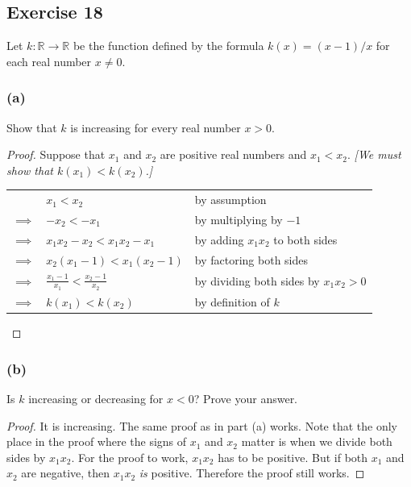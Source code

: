 \documentclass[14pt]{extarticle}
\newcommand{\dps}{\displaystyle}
\newcommand{\R}{\mathbb{R}}
\newcommand{\cy}{\color{cyan}}
\begin{document}
\subsection{Exercise 18}
Let \(k: \R \to \R\) be the function defined by the formula \(k(x) = (x - 1)/x\) for each real number \(x \neq 0\).

\subsubsection{(a)}
Show that \(k\) is increasing for every real number \(x > 0\).

\begin{proof}
Suppose that \(x_1\) and \(x_2\) are positive real numbers and \(x_1 < x_2\). {\it [We must show that \(k(x_1) < k(x_2)\).]} 

\begin{center}
\begin{tabular}{cll}
& \(x_1 < x_2\) & {\cy by assumption} \\
\(\implies\) & \(-x_2 < -x_1\) & {\cy by multiplying by \(-1\)} \\
\(\implies\) & \(x_1x_2 - x_2 < x_1x_2 - x_1\) & {\cy by adding \(x_1x_2\) to both sides} \\
\(\implies\) & \(x_2(x_1 - 1) < x_1(x_2 - 1)\) & {\cy by factoring both sides} \\
\(\implies\) & \(\dps \frac{x_1 - 1}{x_1} < \frac{x_2 - 1}{x_2}\) & {\cy by dividing both sides by \(x_1x_2 > 0\)} \\
\(\implies\) & \(k(x_1) < k(x_2)\) & {\cy by definition of \(k\)}
\end{tabular}
\end{center}

\end{proof}

\subsubsection{(b)}
Is \(k\) increasing or decreasing for \(x < 0\)? Prove your answer.

\begin{proof}
It is increasing. The same proof as in part (a) works. Note that the only place in the proof where the signs of \(x_1\)
and \(x_2\) matter is when we divide both sides by \(x_1x_2\). For the proof to work, \(x_1x_2\) has to be positive. But if
both \(x_1\) and \(x_2\) are negative, then \(x_1x_2\) {\it is} positive. Therefore the proof still works.
\end{proof}
\end{document}

